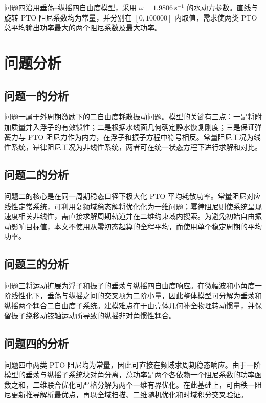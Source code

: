 \documentclass[withoutpreface]{../../../templates/CUMCM2026-Complete-LaTeX/cumcmthesis}
\begin{document}
问题四沿用垂荡--纵摇四自由度模型，采用 $\omega=1.9806\ \mathrm{s^{-1}}$ 的水动力参数。直线与旋转 PTO 阻尼系数均为常量，并分别在 $[0,100000]$ 内取值，需求使两类 PTO 总平均输出功率最大的两个阻尼系数及最大功率。

\section{问题分析}

\subsection{问题一的分析}

问题一属于外周期激励下的二自由度耗散振动问题。模型的关键有三点：一是将附加质量并入浮子的有效惯性；二是根据水线面几何确定静水恢复刚度；三是保证弹簧力与 PTO 阻尼力作为内力，在浮子和振子方程中符号相反。常量阻尼工况为线性系统，幂律阻尼工况为非线性系统，两者可在统一状态方程下进行求解和对比。

\subsection{问题二的分析}

问题二的核心是在同一周期稳态口径下极大化 PTO 平均耗散功率。常量阻尼对应线性定常系统，可利用复频域稳态解将优化化为一维问题；幂律阻尼则使系统呈现速度相关非线性，需直接求解周期轨道并在二维约束域内搜索。为避免初始自由振动影响目标值，本文不使用从零初态起算的全程平均，而使用单个稳定周期的平均功率。

\subsection{问题三的分析}

问题三将运动扩展为浮子和振子的垂荡与纵摇四自由度响应。在微幅波和小角度一阶线性化下，垂荡与纵摇之间的交叉项为二阶小量，因此整体模型可分解为垂荡和纵摇两个耦合二自由度子系统。建模难点在于由壳体几何补全物理转动惯量，并保留振子绕移动铰轴运动所导致的纵摇非对角惯性耦合。

\subsection{问题四的分析}

问题四中两类 PTO 阻尼均为常量，因此可直接在频域求周期稳态响应。由于一阶模型的垂荡与纵摇子系统块对角分离，总功率是两个各依赖一个阻尼系数的功率函数之和，二维联合优化可严格分解为两个一维有界优化。在此基础上，可由秩一阻尼更新推导解析最优点，再以全域扫描、二维随机优化和时域积分交叉验证。
\end{document}
